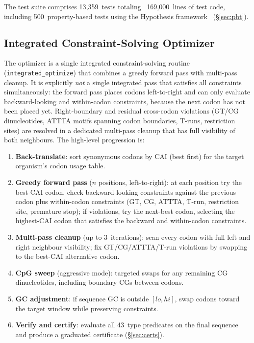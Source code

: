 The test suite comprises 13,359~tests totaling ~169,000~lines of test code,
including 500~property-based tests using the Hypothesis
framework~\cite{maciver2019hypothesis} (\S\ref{sec:pbt}).

\subsection{Integrated Constraint-Solving Optimizer}\label{sec:optimizer}

The optimizer is a single integrated constraint-solving routine
(\texttt{integrated\_optimize}) that combines a greedy forward pass
with multi-pass cleanup.  It is explicitly \emph{not} a single
integrated pass that satisfies all constraints simultaneously: the
forward pass places codons left-to-right and can only evaluate
backward-looking and within-codon constraints, because the next codon
has not been placed yet.  Right-boundary and residual cross-codon
violations (GT/CG dinucleotides, ATTTA motifs spanning codon
boundaries, T-runs, restriction sites) are resolved in a dedicated
multi-pass cleanup that has full visibility of both neighbours.  The
high-level progression is:

\begin{enumerate}[leftmargin=*,itemsep=1pt,topsep=2pt]
\item \textbf{Back-translate}: sort synonymous codons by CAI
      (best first) for the target organism's codon usage table.
\item \textbf{Greedy forward pass} ($n$ positions, left-to-right):
      at each position try the best-CAI codon, check backward-looking
      constraints against the previous codon plus within-codon
      constraints (GT, CG, ATTTA, T-run, restriction site, premature
      stop); if violations, try the next-best codon, selecting the
      highest-CAI codon that satisfies the backward and within-codon
      constraints.
\item \textbf{Multi-pass cleanup} (up to 3~iterations): scan every
      codon with full left and right neighbour visibility; fix
      GT/CG/ATTTA/T-run violations by swapping to the best-CAI
      alternative codon.
\item \textbf{CpG sweep} (aggressive mode): targeted swaps for any
      remaining CG dinucleotides, including boundary CGs between codons.
\item \textbf{GC adjustment}: if sequence GC is outside $[lo, hi]$,
      swap codons toward the target window while preserving constraints.
\item \textbf{Verify and certify}: evaluate all 43~type predicates on
      the final sequence and produce a graduated certificate
      (\S\ref{sec:certs}).
\end{enumerate}

